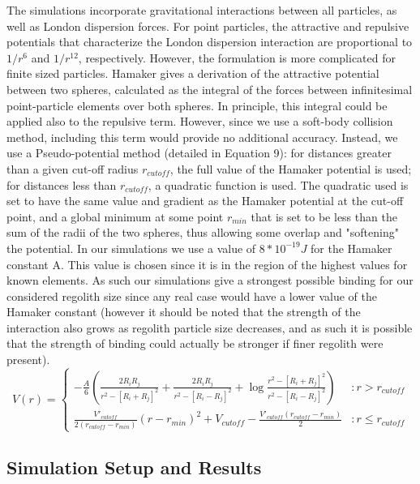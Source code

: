 \documentclass[letterpaper, preprint, paper,11pt]{AAS}	%
\begin{document}
The simulations incorporate gravitational interactions between all particles, as well as London dispersion forces. For point particles, the attractive and repulsive potentials that characterize the London dispersion interaction are proportional to ${1}/{r^6}$ and ${1}/{r^{12}}$, respectively. However, the formulation is more complicated for finite sized particles. Hamaker\cite{hamaker} gives a derivation of the attractive potential between two spheres, calculated as the integral of the forces between infinitesimal point-particle elements over both spheres. In principle, this integral could be applied also to the repulsive term. However, since we use a soft-body collision method, including this term would provide no additional accuracy. Instead, we use a Pseudo-potential method (detailed in Equation 9): for distances greater than a given cut-off radius $r_{cutoff}$, the full value of the Hamaker\cite{hamaker} potential is used; for distances less than $r_{cutoff}$, a quadratic function is used. The quadratic used is set to have the same value and gradient as the Hamaker\cite{hamaker} potential at the cut-off point, and a global minimum at some point $r_{min}$ that is set to be less than the sum of the radii of the two spheres, thus allowing some overlap and "softening" the potential. In our simulations we use a value of $8*10^{-19} J$ for the Hamaker constant A. This value is chosen since it is in the region of the highest values for known elements. As such our simulations give a strongest possible binding for our considered regolith size since any real case would have a lower value of the Hamaker constant (however it should be noted that the strength of the interaction also grows as regolith particle size decreases, and as such it is possible that the strength of binding could actually be stronger if finer regolith were present).
\begin{equation}
V(r) = \left\{
\begin{array}{lr}
-\frac{A}{6}\left(\frac{2R_iR_j}{r^2-[R_i+R_j]^2}+\frac{2R_iR_j}{r^2-[R_i-R_j]^2}+\log\frac{r^2-[R_i+R_j]^2}{r^2-[R_i-R_j]^2}\right) & : r > r_{cutoff}\\
\frac{V'_{cutoff}}{2(r_{cutoff}-r_{min})}(r-r_{min})^2+V_{cutoff} - \frac{V'_{cutoff}(r_{cutoff}-r_{min})}{2} & : r \leq r_{cutoff}
\end{array}
\right.
\end{equation}


\pagebreak

\subsection{Simulation Setup and Results}
\end{document}
